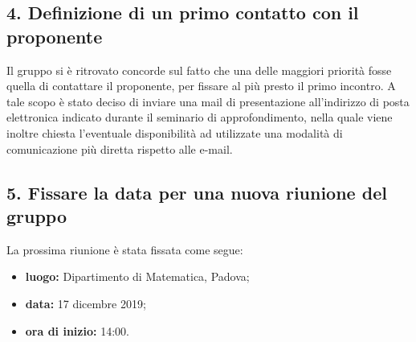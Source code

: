 \subsection*{4. Definizione di un primo contatto con il proponente}

Il gruppo si è ritrovato concorde sul fatto che una delle maggiori priorità fosse quella di contattare il proponente, per fissare al più presto il primo incontro.
A tale scopo è stato deciso di inviare una mail di presentazione all'indirizzo di posta elettronica indicato durante il seminario di approfondimento, nella quale viene inoltre chiesta l'eventuale disponibilità ad utilizzate una modalità di comunicazione più diretta rispetto alle e-mail.

\subsection*{5. Fissare la data per una nuova riunione del gruppo}

La prossima riunione è stata fissata come segue:
\begin{itemize}
	\item \textbf{luogo:} Dipartimento di Matematica, Padova;
	\item \textbf{data:} 17 dicembre 2019;
	\item \textbf{ora di inizio:} 14:00.
\end{itemize}

